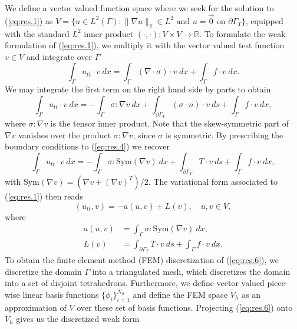 We define a vector valued function space where we seek for the solution to (\ref{eq:res.1}) as $V = \{ u \in L^2(\Gamma) : \| \nabla u \|_2 \in L^2 \text{ and } u = \vec 0 \text{ on } \partial \Gamma_T \}$, equipped with the standard $L^2$ inner product $(\cdot,\cdot):V\times V \to \mathbb R$. To formulate the weak formulation of (\ref{eq:res.1}), we multiply it with the vector valued test function $v \in V$ and integrate over $\Gamma$
\begin{equation}  \label{eq:res.3}
	\int_{\Gamma} u_{tt} \cdot v\ dx = \int_{\Gamma} (\nabla \cdot \sigma) \cdot v \ dx + \int_{\Gamma} f \cdot v \ dx.
\end{equation}
We may integrate the first term on the right hand side by parts to obtain
\begin{equation}  \label{eq:res.4}
	\int_{\Gamma} u_{tt} \cdot v\ dx = - \int_{\Gamma} \sigma : \nabla v \ dx+ \int_{\partial \Gamma_T} (\sigma \cdot n) \cdot v\ ds +  \int_{\Gamma} f \cdot v \ dx,
\end{equation}
where $\sigma : \nabla v$ is the tensor inner product. Note that the skew-symmetric part of $\nabla v$ vanishes over the product $\sigma : \nabla v$, since $\sigma$ is symmetric. By prescribing the boundary conditions to (\ref{eq:res.4}) we recover
\begin{equation} \label{eq:res.5}
	\int_{\Gamma} u_{tt} \cdot v\ dx = - \int_{\Gamma} \sigma : \text{Sym}(\nabla v) \ dx+ \int_{\partial \Gamma_T} T \cdot v\ ds +  \int_{\Gamma} f \cdot v \ dx,
\end{equation}
with Sym$(\nabla v) = (\nabla v + (\nabla v)^T)/2$. The variational form associated to (\ref{eq:res.1}) then reads
\begin{equation} \label{eq:res.6}
	(u_{tt},v) = - a(u,v) + L(v), \quad u,v\in V,
\end{equation}
where
\begin{equation} \label{eq:res.7}
\begin{aligned}
	a(u,v) &= \int_{\Gamma} \sigma : \text{Sym}(\nabla v) \ dx, \\
	L(v) &= \int_{\partial \Gamma_T} T \cdot v\ ds +  \int_{\Gamma} f \cdot v \ dx.
\end{aligned}
\end{equation}
To obtain the finite element method (FEM) discretization of (\ref{eq:res.6}), we discretize the domain $\Gamma$ into a triangulated mesh, which discretizes the domain into a set of disjoint tetrahedrons. Furthermore, we define vector valued piece-wise linear basis functions $\{\phi_i\}_{i=1}^{N_h}$ and define the FEM space $V_h$ as an approximation of $V$ over these set of basis functions. Projecting (\ref{eq:res.6}) onto $V_h$ gives us the discretized weak form
